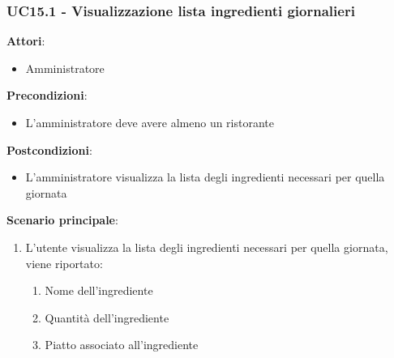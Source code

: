 \subsubsection{UC15.1 - Visualizzazione lista ingredienti giornalieri}\label{usecase:15_1}
\textbf{Attori}:
\begin{itemize}
    \item Amministratore
\end{itemize}
\textbf{Precondizioni}:
\begin{itemize}
    \item L'amministratore deve avere almeno un ristorante
\end{itemize}
\textbf{Postcondizioni}:
\begin{itemize}
    \item L'amministratore visualizza la lista degli ingredienti necessari per quella giornata
\end{itemize}
\textbf{Scenario principale}:
\begin{enumerate}
    \item L'utente visualizza la lista degli ingredienti necessari per quella giornata, viene riportato:
    \begin{enumerate}
        \item Nome dell'ingrediente
        \item Quantità dell'ingrediente
        \item Piatto associato all'ingrediente
    \end{enumerate}
\end{enumerate}